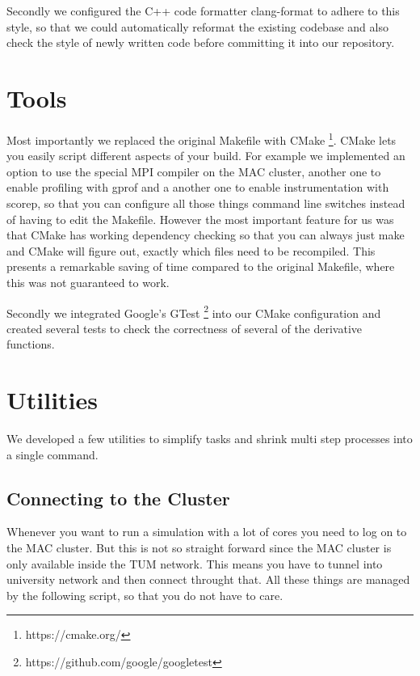 Secondly we configured the C++ code formatter clang-format to adhere to this
style, so that we could automatically reformat the existing codebase and also
check the style of newly written code before committing it into our repository.

\section{Tools}

Most importantly we replaced the original Makefile with CMake
\footnote{https://cmake.org/}. CMake lets you easily script different aspects of
your build. For example we implemented an option to use the special MPI compiler
on the MAC cluster, another one to enable profiling with gprof and a another one
to enable instrumentation with scorep, so that you can configure all those
things command line switches instead of having to edit the Makefile. However the
most important feature for us was that CMake has working dependency checking so
that you can always just make and CMake will figure out, exactly which files
need to be recompiled. This presents a remarkable saving of time compared to the
original Makefile, where this was not guaranteed to work.

Secondly we integrated Google's GTest
\footnote{https://github.com/google/googletest} into our CMake configuration and
created several tests to check the correctness of several of the derivative
functions.

\section{Utilities}

We developed a few utilities to simplify tasks and shrink multi step processes
into a single command.

\subsection{Connecting to the Cluster}

Whenever you want to run a simulation with a lot of cores you need to log on to
the MAC cluster. But this is not so straight forward since the MAC cluster is
only available inside the TUM network. This means you have to tunnel into
university network and then connect throught that. All these things are managed
by the following script, so that you do not have to care.


